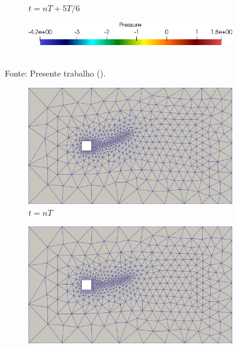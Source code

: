 \begin{figure}[h!]
\begin{subfigure}[b]{0.32\textwidth}
        \caption{$t=nT+5T/6$}
    \end{subfigure}
    \begin{subfigure}[b]{0.49\textwidth}
        \includegraphics[width=\linewidth]{Figuras/FSI-prism2/pLegenda.png}
    \end{subfigure}
    \\Fonte: Presente trabalho (\the\year).
    \label{fig:prismPres2}
\end{figure}

\begin{figure}[h!]
    \centering
    \caption{\textit{Flutter} em painel - Configurações da malha obtidas no problema.}
    \begin{subfigure}[b]{0.49\textwidth}
        \includegraphics[width=\linewidth]{Figuras/FSI-prism2/mT1.png}
        \caption{$t=nT$}
    \end{subfigure}
    \begin{subfigure}[b]{0.49\textwidth}
        \includegraphics[width=\linewidth]{Figuras/FSI-prism2/mT2.png}

\end{subfigure}
\end{figure}
